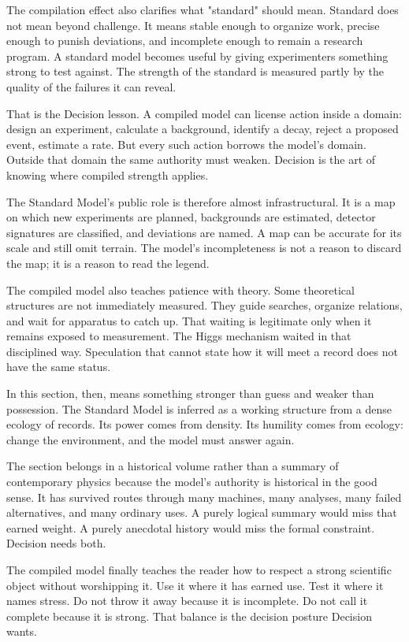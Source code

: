 The compilation effect also clarifies what "standard" should mean. Standard
does not mean beyond challenge. It means stable enough to organize work,
precise enough to punish deviations, and incomplete enough to remain a
research program. A standard model becomes useful by giving experimenters
something strong to test against. The strength of the standard is measured
partly by the quality of the failures it can reveal.

That is the Decision lesson. A compiled model can license action inside a
domain: design an experiment, calculate a background, identify a decay,
reject a proposed event, estimate a rate. But every such action borrows the
model's domain. Outside that domain the same authority must weaken. Decision
is the art of knowing where compiled strength applies.

The Standard Model's public role is therefore almost infrastructural. It is a
map on which new experiments are planned, backgrounds are estimated, detector
signatures are classified, and deviations are named. A map can be accurate
for its scale and still omit terrain. The model's incompleteness is not a
reason to discard the map; it is a reason to read the legend.

The compiled model also teaches patience with theory. Some theoretical
structures are not immediately measured. They guide searches, organize
relations, and wait for apparatus to catch up. That waiting is legitimate
only when it remains exposed to measurement. The Higgs mechanism waited in
that disciplined way. Speculation that cannot state how it will meet a record
does not have the same status.

In this section, then,  means something stronger than guess and
weaker than possession. The Standard Model is inferred as a working structure
from a dense ecology of records. Its power comes from density. Its humility
comes from ecology: change the environment, and the model must answer again.

The section belongs in a historical volume rather than a summary of
contemporary physics because the model's authority is historical in the
good sense. It has survived routes through many machines, many analyses, many
failed alternatives, and many ordinary uses. A purely logical summary would
miss that earned weight. A purely anecdotal history would miss the formal
constraint. Decision needs both.

The compiled model finally teaches the reader how to respect a strong
scientific object without worshipping it. Use it where it has earned use.
Test it where it names stress. Do not throw it away because it is incomplete.
Do not call it complete because it is strong. That balance is the decision
posture Decision wants.

